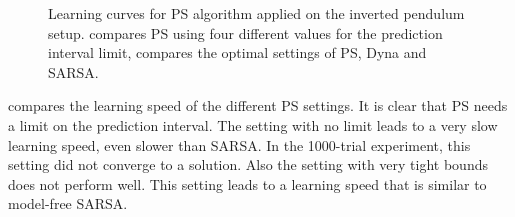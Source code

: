 \begin{figure}[htbp]
	\centering
	\caption[Inverted pendulum: \acs{PS} compared to Dyna and SARSA]{Learning curves for \ac{PS} algorithm applied on the inverted pendulum setup.  compares \ac{PS} using four different values for the prediction interval limit,  compares the optimal settings of \ac{PS}, Dyna and SARSA.}
	\label{fig:PS-PScompared}
\end{figure}

 compares the learning speed of the different \ac{PS} settings. It is clear that \ac{PS} needs a limit on the prediction interval. The setting with no limit leads to a very slow learning speed, even slower than SARSA. In the 1000-trial experiment, this setting did not converge to a solution. Also the setting with very tight bounds does not perform well. This setting leads to a learning speed that is similar to model-free SARSA.


